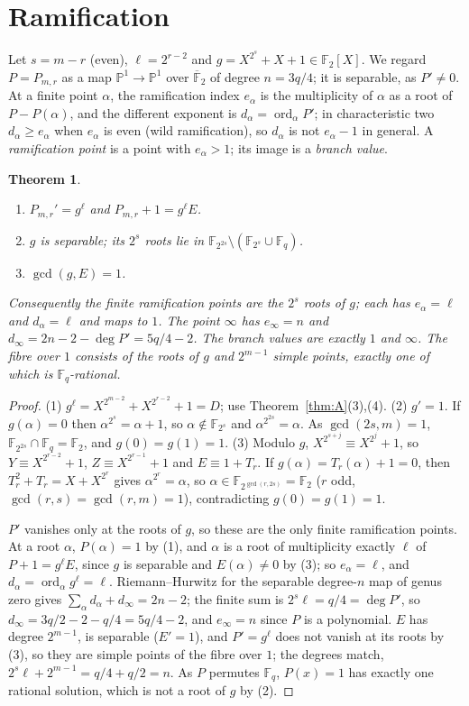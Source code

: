 \documentclass[preprint,12pt]{elsarticle}
\newtheorem{theorem}{Theorem}[section]
\theoremstyle{definition}
\newcommand{\F}{\mathbb{F}}
\begin{document}
\section{Ramification}\label{sec:B}
Let $s=m-r$ (even), $\ell=2^{r-2}$ and $g=X^{2^s}+X+1\in\F_2[X]$. We regard $P=P_{m,r}$ as a map $\mathbb P^1\to\mathbb P^1$ over $\overline{\F}_2$ of degree $n=3q/4$; it is separable, as $P'\ne0$. At a finite point $\alpha$, the ramification index $e_\alpha$ is the multiplicity of $\alpha$ as a root of $P-P(\alpha)$, and the different exponent is $d_\alpha=\operatorname{ord}_\alpha P'$; in characteristic two $d_\alpha\ge e_\alpha$ when $e_\alpha$ is even (wild ramification), so $d_\alpha$ is not $e_\alpha-1$ in general. A \emph{ramification point} is a point with $e_\alpha>1$; its image is a \emph{branch value}.
\begin{theorem}\label{thm:B}
\begin{enumerate}
\item $P_{m,r}'=g^{\ell}$ and $P_{m,r}+1=g^{\ell}E$.
\item $g$ is separable; its $2^s$ roots lie in $\F_{2^{2s}}\setminus(\F_{2^s}\cup\F_q)$.
\item $\gcd(g,E)=1$.
\end{enumerate}
Consequently the finite ramification points are the $2^s$ roots of $g$; each has $e_\alpha=\ell$ and $d_\alpha=\ell$ and maps to $1$. The point $\infty$ has $e_\infty=n$ and $d_\infty=2n-2-\deg P'=5q/4-2$. The branch values are exactly $1$ and $\infty$. The fibre over $1$ consists of the roots of $g$ and $2^{m-1}$ simple points, exactly one of which is $\F_q$-rational.
\end{theorem}
\begin{proof}
(1) $g^{\ell}=X^{2^{m-2}}+X^{2^{r-2}}+1=D$; use Theorem~\ref{thm:A}(3),(4). (2) $g'=1$. If $g(\alpha)=0$ then $\alpha^{2^s}=\alpha+1$, so $\alpha\notin\F_{2^s}$ and $\alpha^{2^{2s}}=\alpha$. As $\gcd(2s,m)=1$, $\F_{2^{2s}}\cap\F_q=\F_2$, and $g(0)=g(1)=1$. (3) Modulo $g$, $X^{2^{s+j}}\equiv X^{2^j}+1$, so $Y\equiv X^{2^{r-2}}+1$, $Z\equiv X^{2^{r-1}}+1$ and $E\equiv1+T_r$. If $g(\alpha)=T_r(\alpha)+1=0$, then $T_r^2+T_r=X+X^{2^r}$ gives $\alpha^{2^r}=\alpha$, so $\alpha\in\F_{2^{\gcd(r,2s)}}=\F_2$ ($r$ odd, $\gcd(r,s)=\gcd(r,m)=1$), contradicting $g(0)=g(1)=1$.

$P'$ vanishes only at the roots of $g$, so these are the only finite ramification points. At a root $\alpha$, $P(\alpha)=1$ by (1), and $\alpha$ is a root of multiplicity exactly $\ell$ of $P+1=g^{\ell}E$, since $g$ is separable and $E(\alpha)\neq0$ by (3); so $e_\alpha=\ell$, and $d_\alpha=\operatorname{ord}_\alpha g^{\ell}=\ell$. Riemann--Hurwitz for the separable degree-$n$ map of genus zero gives $\sum_\alpha d_\alpha+d_\infty=2n-2$; the finite sum is $2^s\ell=q/4=\deg P'$, so $d_\infty=3q/2-2-q/4=5q/4-2$, and $e_\infty=n$ since $P$ is a polynomial. $E$ has degree $2^{m-1}$, is separable ($E'=1$), and $P'=g^\ell$ does not vanish at its roots by (3), so they are simple points of the fibre over $1$; the degrees match, $2^s\ell+2^{m-1}=q/4+q/2=n$. As $P$ permutes $\F_q$, $P(x)=1$ has exactly one rational solution, which is not a root of $g$ by (2).
\end{proof}
\end{document}
